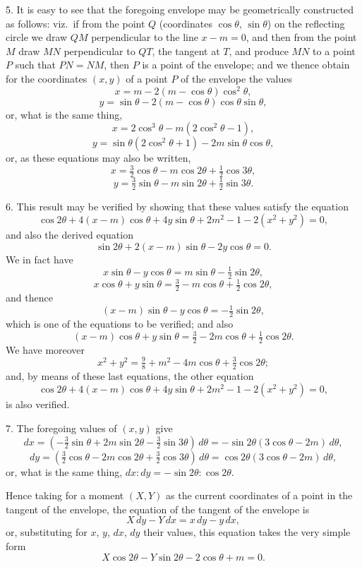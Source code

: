 \documentclass[11pt,a4paper]{article}
\theoremstyle{plain}
\begin{document}
5. It is easy to see that the foregoing envelope may be geometrically constructed as follows: viz.\ if from the point $Q$ (coordinates $\cos\theta$, $\sin\theta$) on the reflecting circle we draw $QM$ perpendicular to the line $x - m = 0$, and then from the point $M$ draw $MN$ perpendicular to $QT$, the tangent at $T$, and produce $MN$ to a point $P$ such that $PN = NM$, then $P$ is a point of the envelope; and we thence obtain for the coordinates $(x, y)$ of a point $P$ of the envelope the values
\[
x = m - 2(m - \cos\theta)\cos^2\theta,
\]
\[
y = \sin\theta - 2(m - \cos\theta)\cos\theta\sin\theta,
\]
or, what is the same thing,
\[
x = 2\cos^3\theta - m(2\cos^2\theta - 1),
\]
\[
y = \sin\theta(2\cos^2\theta + 1) - 2m\sin\theta\cos\theta,
\]
or, as these equations may also be written,
\[
x = \tfrac32\cos\theta - m\cos 2\theta + \tfrac12\cos 3\theta,
\]
\[
y = \tfrac32\sin\theta - m\sin 2\theta + \tfrac12\sin 3\theta.
\]

6. This result may be verified by showing that these values satisfy the equation
\[
\cos 2\theta + 4(x-m)\cos\theta + 4y\sin\theta + 2m^2 - 1 - 2(x^2 + y^2) = 0,
\]
and also the derived equation
\[
\sin 2\theta + 2(x-m)\sin\theta - 2y\cos\theta = 0.
\]
We in fact have
\[
x\sin\theta - y\cos\theta = m\sin\theta - \tfrac12\sin 2\theta,
\]
\[
x\cos\theta + y\sin\theta = \tfrac32 - m\cos\theta + \tfrac12\cos 2\theta,
\]
and thence
\[
(x-m)\sin\theta - y\cos\theta = -\tfrac12\sin 2\theta,
\]
which is one of the equations to be verified; and also
\[
(x-m)\cos\theta + y\sin\theta = \tfrac32 - 2m\cos\theta + \tfrac12\cos 2\theta.
\]
We have moreover
\[
x^2 + y^2 = \tfrac98 + m^2 - 4m\cos\theta + \tfrac32\cos 2\theta;
\]
and, by means of these last equations, the other equation
\[
\cos 2\theta + 4(x-m)\cos\theta + 4y\sin\theta + 2m^2 - 1 - 2(x^2 + y^2) = 0,
\]
is also verified.

7. The foregoing values of $(x, y)$ give
\[
dx = (-\tfrac32\sin\theta + 2m\sin 2\theta - \tfrac32\sin 3\theta)\,d\theta = -\sin 2\theta(3\cos\theta - 2m)\,d\theta,
\]
\[
dy = (\tfrac32\cos\theta - 2m\cos 2\theta + \tfrac32\cos 3\theta)\,d\theta = \cos 2\theta(3\cos\theta - 2m)\,d\theta,
\]
or, what is the same thing, $dx : dy = -\sin 2\theta : \cos 2\theta$.

Hence taking for a moment $(X, Y)$ as the current coordinates of a point in the tangent of the envelope, the equation of the tangent of the envelope is
\[
X\,dy - Y\,dx = x\,dy - y\,dx,
\]
or, substituting for $x$, $y$, $dx$, $dy$ their values, this equation takes the very simple form
\[
X\cos 2\theta - Y\sin 2\theta - 2\cos\theta + m = 0.
\]
\end{document}
